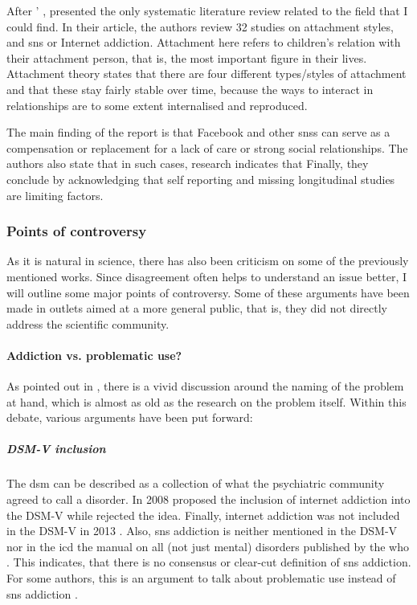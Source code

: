 After \citeauthor{kuss_social_2017}' , \citet{darienzo_addiction_2019} presented the only systematic literature review related to the field that I could find.
In their article, the authors review 32 studies on attachment styles, and \gls{sns} or Internet addiction.
Attachment here refers to children's relation with their attachment person, that is, the most important figure in their lives. 
Attachment theory states that there are four different types/styles of attachment and that these stay fairly stable over time, because the ways to interact in relationships are to some extent internalised and reproduced.

The main finding of the report is that Facebook and other \gls{sns}s can serve as a compensation or replacement for a lack of care or strong social relationships.
The authors also state that in such cases, research indicates that  \citep{darienzo_addiction_2019}
Finally, they conclude by acknowledging that self reporting and missing longitudinal studies are limiting factors.

\subsubsection{Points of controversy}
\label{sub:contr}
As it is natural in science, there has also been criticism on some of the previously mentioned works. 
Since disagreement often helps to understand an issue better, I will outline some major points of controversy.
Some of these arguments have been made in outlets aimed at a more general public, that is, they did not directly address the scientific community.

\paragraph{Addiction vs. problematic use?} As pointed out in \citep{ryding_internet_2018}, there is a vivid discussion around the naming of the problem at hand, which is almost as old as the research on the problem itself. Within this debate, various arguments have been put forward:

\subparagraph{DSM-V inclusion} The \acrlong{dsm} can be described as a collection of what the psychiatric community agreed to call a disorder. 
In 2008 \citet{block_issues_2008} proposed the inclusion of internet addiction into the DSM-V while \citet{weinstein_internet_2010} rejected the idea. 
Finally, internet addiction was not included in the DSM-V in 2013 \citep{ryan_uses_2014}.
Also, \gls{sns} addiction is neither mentioned in the DSM-V nor in the \gls{icd} the manual on all (not just mental) disorders published by the \gls{who} \citep{who_icd-11_2019}.
This indicates, that there is no consensus or clear-cut definition of \gls{sns} addiction.
For some authors, this is an argument to talk about problematic use instead of \gls{sns} addiction \citep{rosen_obsessiveaddictive_2018, john_too_2021}. 

